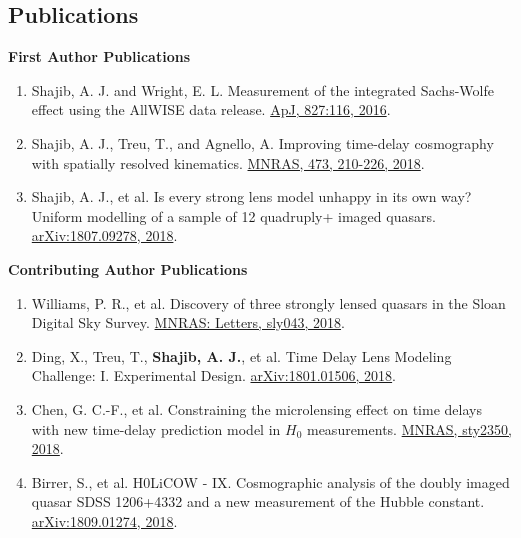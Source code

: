 \documentclass[margin,line]{res}
\begin{document}
\begin{resume}


\section{\sc Publications}
\textbf{First Author Publications} \\
\begin{enumerate}
	\item {Shajib, A. J.} and Wright, E. L. Measurement of the integrated Sachs-Wolfe effect using the AllWISE data release. \href{http://dx.doi.org/10.3847/0004-637X/827/2/116}{ApJ, 827:116, 2016}.
	\item {Shajib, A. J.}, Treu, T., and Agnello, A. Improving time-delay cosmography with spatially resolved kinematics. \href{https://doi.org/10.1093/mnras/stx2302}{MNRAS, 473, 210-226, 2018}.
	\item {Shajib, A. J.}, et al. Is every strong lens model unhappy in its own way? Uniform modelling of a sample of 12 quadruply+ imaged quasars. \href{https://arxiv.org/abs/1807.09278}{arXiv:1807.09278, 2018}.
\end{enumerate}


\textbf{Contributing Author Publications} \\
\begin{enumerate}
	\item Williams, P. R., et al. Discovery of three strongly lensed quasars in the Sloan Digital Sky Survey. \href{https://doi.org/10.1093/mnrasl/sly043}{MNRAS: Letters, sly043, 2018}.
	\item Ding, X., Treu, T., {\bf Shajib, A. J.}, et al. Time Delay Lens Modeling Challenge: I. Experimental Design. \href{https://arxiv.org/abs/1801.01506}{arXiv:1801.01506, 2018}.
	\item Chen, G. C.-F., et al. Constraining the microlensing effect on time delays with new time-delay prediction model in $H_0$ measurements. \href{https://doi.org/10.1093/mnras/sty2350}{MNRAS, sty2350, 2018}.
	\item Birrer, S., et al. H0LiCOW - IX. Cosmographic analysis of the doubly imaged quasar SDSS 1206+4332 and a new measurement of the Hubble constant. \href{https://arxiv.org/abs/1809.01274}{arXiv:1809.01274, 2018}.
 
\end{enumerate}



\end{resume}
\end{document}

